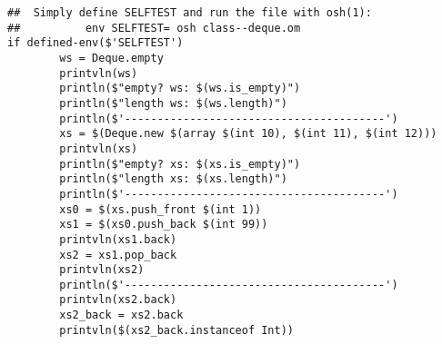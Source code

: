\begin{verbatim}
##  Simply define SELFTEST and run the file with osh(1):
##          env SELFTEST= osh class--deque.om
if defined-env($'SELFTEST')
        ws = Deque.empty
        printvln(ws)
        println($"empty? ws: $(ws.is_empty)")
        println($"length ws: $(ws.length)")
        println($'----------------------------------------')
        xs = $(Deque.new $(array $(int 10), $(int 11), $(int 12)))
        printvln(xs)
        println($"empty? xs: $(xs.is_empty)")
        println($"length xs: $(xs.length)")
        println($'----------------------------------------')
        xs0 = $(xs.push_front $(int 1))
        xs1 = $(xs0.push_back $(int 99))
        printvln(xs1.back)
        xs2 = xs1.pop_back
        printvln(xs2)
        println($'----------------------------------------')
        printvln(xs2.back)
        xs2_back = xs2.back
        printvln($(xs2_back.instanceof Int))
\end{verbatim}

